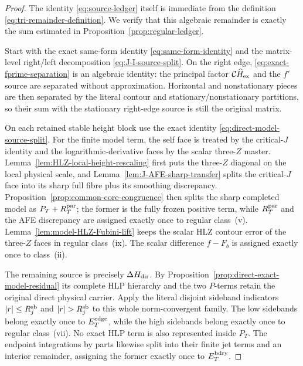 \begin{proof}
The identity \eqref{eq:source-ledger} itself is immediate from the definition
\eqref{eq:tri-remainder-definition}.  We verify that this algebraic remainder
is exactly the sum estimated in Proposition~\ref{prop:regular-ledger}.

Start with the exact same-form identity \eqref{eq:same-form-identity} and the
matrix-level right/left decomposition \eqref{eq:J-I-source-split}.  On the
right edge, \eqref{eq:exact-fprime-separation} is an algebraic identity: the
principal factor $\mathcal C\widehat H_{\rm ex}$ and the $f'$ source are
separated without approximation.  Horizontal and nonstationary pieces are
then separated by the literal contour and stationary/nonstationary partitions,
so their sum with the stationary right-edge source is still the original
matrix.

On each retained stable height block use the exact identity
\eqref{eq:direct-model-source-split}.  For the finite model term, the self face
is treated by the critical-$J$ identity and the logarithmic-derivative faces by
the scalar three-$Z$ master.  Lemma~\ref{lem:HLZ-local-height-rescaling} first
puts the three-$Z$ diagonal on the local physical scale, and
Lemma~\ref{lem:J-AFE-sharp-transfer} splits the critical-$J$ face into its sharp
full fibre plus its smoothing discrepancy.  Proposition~\ref{prop:common-core-congruence}
then splits the sharp completed model as $P_T+R_T^{\rm par}$; the former is the
fully frozen positive term, while $R_T^{\rm par}$ and the AFE discrepancy are
assigned exactly once to regular class~(v).  Lemma~\ref{lem:model-HLZ-Fubini-lift}
keeps the scalar HLZ contour error of the three-$Z$ faces in regular class~(ix).
The scalar difference $f-F_b$ is assigned exactly once to class~(ii).

The remaining source is precisely $\Delta H_{\rm dir}$.  By
Proposition~\ref{prop:direct-exact-model-residual} its complete HLP hierarchy
and the two $P$-terms retain the original direct physical carrier.  Apply the
literal disjoint sideband indicators $|r|\le R_j^{\rm sb}$ and
$|r|>R_j^{\rm sb}$ to this whole norm-convergent family.  The low sidebands
belong exactly once to $E_T^{\rm edge}$, while the high sidebands belong exactly
once to regular class~(vii).  No exact HLP term is also represented inside
$P_T$.  The endpoint integrations by parts likewise split into their finite jet
terms and an interior remainder, assigning the former exactly once to
$E_T^{\rm bdry}$.


\end{proof}
